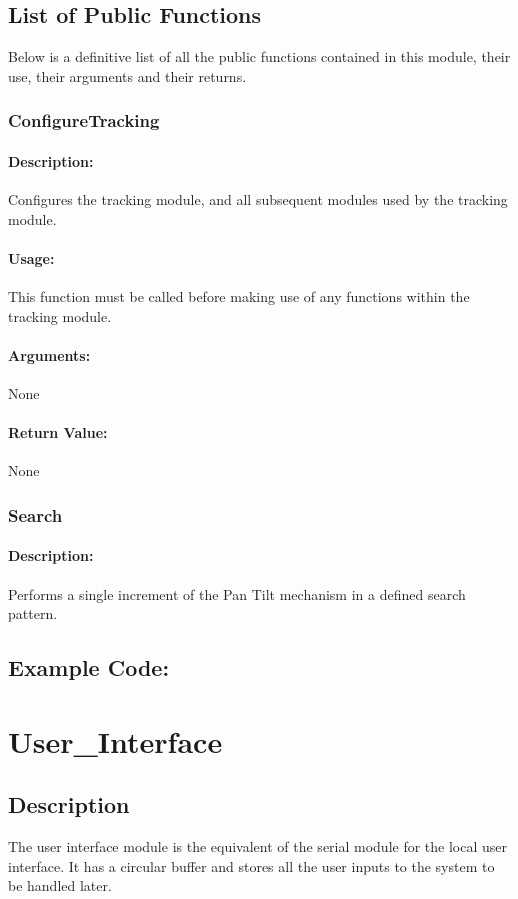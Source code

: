 \documentclass[]{report}
\begin{document}
\section{List of Public Functions}
Below is a definitive list of all the public functions contained in this module, their use, their arguments and their returns.

\subsection{ConfigureTracking}
\subsubsection{Description:}
Configures the tracking module, and all subsequent modules used by the tracking module.

\subsubsection{Usage:}
This function must be called before making use of any functions within the tracking module.

\subsubsection{Arguments:}
None

\subsubsection{Return Value:}
None

\subsection{Search}
\subsubsection{Description:}
Performs a single increment of the Pan Tilt mechanism in a defined search pattern.

\section{Example Code:}


\chapter{User\_Interface}
\section{Description}
The user interface module is the equivalent of the serial module for the local user interface. It has a circular buffer and stores all the user inputs to the system to be handled later.
\end{document}
